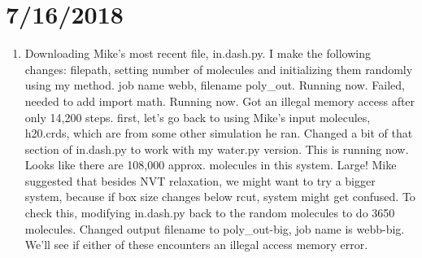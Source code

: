 \documentclass[12pt,reqno]{amsart}
\numberwithin{equation}{section}
\begin{document}
\section{7/16/2018}
\begin{enumerate}
\item Downloading Mike's most recent file, in.dash.py.  I make the following changes: filepath, setting number of molecules and initializing them randomly using my method.  job name webb, filename poly\_out.  Running now.  Failed, needed to add import math.  Running now.  Got an illegal memory access after only 14,200 steps.  first, let's go back to using Mike's input molecules, h20.crds, which are from some other simulation he ran.  Changed a bit of that section of in.dash.py to work with my water.py version.  This is running now.  Looks like there are 108,000 approx. molecules in this system.  Large!  Mike suggested that besides NVT relaxation, we might want to try a bigger system, because if box size changes below rcut, system might get confused.  To check this, modifying in.dash.py back to the random molecules to do 3650 molecules.  Changed output filename to poly\_out-big, job name is webb-big.  We'll see if either of these encounters an illegal access memory error.  
\end{enumerate}
\end{document}

